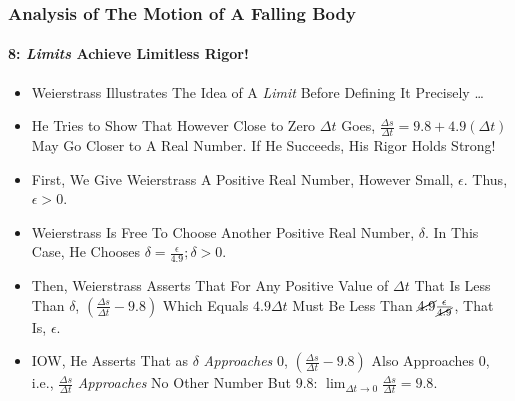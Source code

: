 \begin{frame}
\frametitle{Analysis of The Motion of \alert{A Falling Body}}
\framesubtitle{8: \textit{Limits} Achieve Limitless Rigor!} 
\label{slide:analysis-of-falling-body-8}
\begin{itemize}
\pause
\item Weierstrass Illustrates The Idea of A \textit{Limit} Before Defining It Precisely \dots
\pause
\item He Tries to Show That However Close to Zero $\Delta t$ Goes, $\frac{\Delta s}{\Delta t}=9.8+4.9(\Delta t)$ May Go Closer to A Real Number. If He Succeeds, His Rigor Holds Strong!
\pause
\item First, We Give Weierstrass A \alert{Positive Real Number}, However Small, $\epsilon$. Thus, \alert{$\epsilon>0$}.
\pause
\item Weierstrass Is Free To \alert{Choose Another Positive Real Number, $\delta$}. In This Case, He Chooses $\delta=\frac{\epsilon}{4.9}; \delta>0$.
\pause
\item Then, Weierstrass Asserts That \alert{For Any Positive Value of $\Delta t$ That Is Less Than $\delta$}, $(\frac{\Delta s}{\Delta t}-9.8)$ Which Equals $4.9\Delta t$ \alert{Must Be Less Than $\cancel{4.9}\frac{\epsilon}{\cancel{4.9}}$, That Is, $\epsilon$}.
\pause
\item IOW, He Asserts That as $\delta$ \textit{Approaches} 0, $(\frac{\Delta s}{\Delta t}-9.8)$ Also Approaches 0, i.e., \alert{$\frac{\Delta s}{\Delta t}$ \textit{Approaches} No Other Number But 9.8}: $\displaystyle{\lim_{\Delta t\to0}\frac{\Delta s}{\Delta t}}=9.8$.
\end{itemize}
\end{frame}
